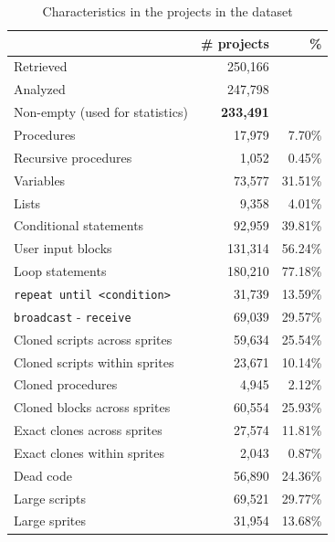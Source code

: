 \documentclass{sig-alternate}
\begin{document}
\begin{table}[ht]
	\centering
	\begin{tabular}{lrr}
		\hline
		&\textbf{\# projects}&\textbf{\%}\\
		\hline
		Retrieved & 250,166 & \\
		Analyzed & 247,798 & \\
		Non-empty (used for statistics) & \textbf{233,491} & \\
		\hline
		Procedures & 17,979 & 7.70\%\\
		Recursive procedures &  1,052 & 0.45\%\\
		Variables & 73,577 & 31.51\% \\
		Lists & 9,358 & 4.01\% \\
		Conditional statements & 92,959 & 39.81\% \\
		User input blocks& 131,314 & 56.24\% \\
		Loop statements & 180,210 & 77.18\% \\
		\texttt{repeat until <condition>} & 31,739 & 13.59\% \\
		\texttt{broadcast} - \texttt{receive} & 69,039 & 29.57\%\\
		Cloned scripts across sprites & 59,634 & 25.54\% \\
		Cloned scripts within sprites & 23,671 & 10.14\%\\
		Cloned procedures & 4,945 & 2.12\%\\
		Cloned blocks across sprites & 60,554 & 25.93\%\\
		Exact clones across sprites & 27,574 & 11.81\%\\
		Exact clones within sprites & 2,043 & 0.87\%\\
		Dead code & 56,890	& 24.36\%\\
		Large scripts & 69,521 & 29.77\%\\
		Large sprites & 31,954 & 13.68\%\\		
		\hline
	\end{tabular}
	\caption{Characteristics in the projects in the dataset}
	\label{tbl-characteristics}
\end{table}
\end{document}

